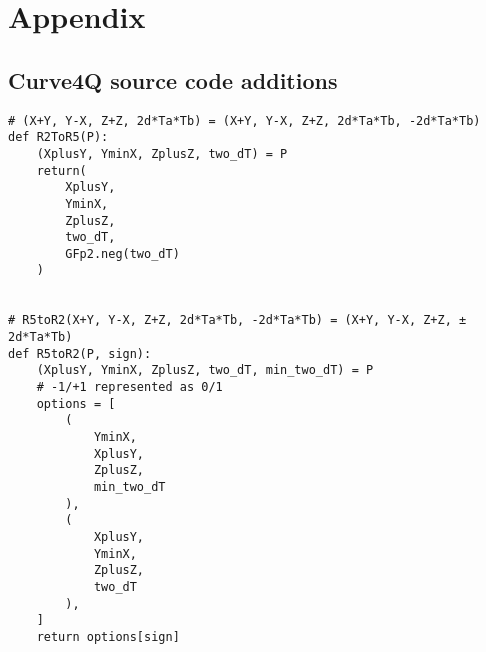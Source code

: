 
\appendix
{}

\chapter{Appendix} \label{Appendix}

\section{Curve4Q source code additions} \label{appendix: curve4q modifications}
%
\begin{verbatim}
# (X+Y, Y-X, Z+Z, 2d*Ta*Tb) = (X+Y, Y-X, Z+Z, 2d*Ta*Tb, -2d*Ta*Tb)
def R2ToR5(P):
    (XplusY, YminX, ZplusZ, two_dT) = P
    return(
        XplusY,
        YminX,
        ZplusZ,
        two_dT,
        GFp2.neg(two_dT)
    )


# R5toR2(X+Y, Y-X, Z+Z, 2d*Ta*Tb, -2d*Ta*Tb) = (X+Y, Y-X, Z+Z, ± 2d*Ta*Tb)
def R5toR2(P, sign):
    (XplusY, YminX, ZplusZ, two_dT, min_two_dT) = P
    # -1/+1 represented as 0/1
    options = [
        (
            YminX,
            XplusY,
            ZplusZ,
            min_two_dT
        ),
        (
            XplusY,
            YminX,
            ZplusZ,
            two_dT
        ),
    ]
    return options[sign]
\end{verbatim}
%  


